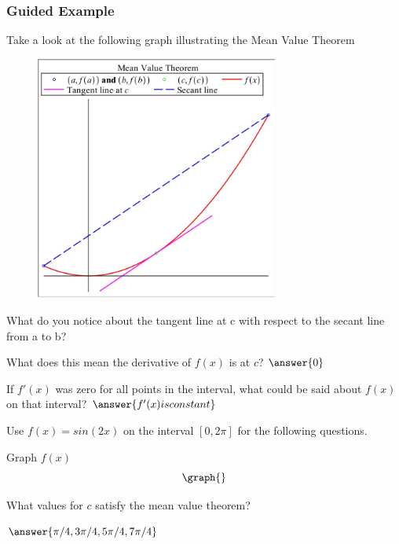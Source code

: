 \documentclass{ximera}
\begin{document}
\subsubsection{Guided Example}
Take a look at the following graph illustrating the Mean Value Theorem
\begin{figure}
    \centering
    \includegraphics[width=80mm]{meanvalue.jpg}
    \label{fig:meanvalue}
\end{figure}
\begin{question}
What do you notice about the tangent line at c with respect to the secant line from a to b?
\begin{freeResponse}
\end{freeResponse}
What does this mean the derivative of $f(x)$ is at $c$?
$\answer{0}$
\end{question}
\begin{question}
If $f'(x)$ was zero for all points in the interval, what could be said about $f(x)$ on that interval?
$\answer{f'(x) is constant}$
\end{question}
\begin{question}
Use $f(x)=sin(2x)$ on the interval $[0,2\pi]$ for the following questions.

Graph $f(x)$
\[
\graph{}
\]

What values for $c$ satisfy the mean value theorem?

$\answer{\pi/4,3\pi/4,5\pi/4, 7\pi/4}$
\end{question}
\end{document}
